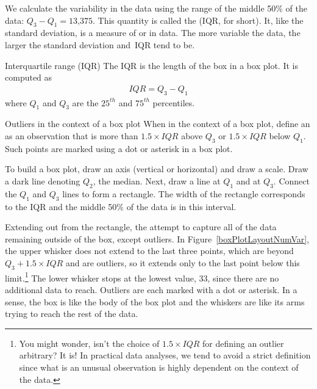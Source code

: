 We calculate the variability in the data using the range of the middle 50\% of the data: $Q_3 - Q_1 = \text{13,375}$. This quantity is called the  (IQR, for short). It, like the standard deviation, is a measure of  or  in data. The more variable the data, the larger the standard deviation and~IQR tend to be.

\D{\newpage}

\begin{onebox}{Interquartile range (IQR)}
The IQR is the length of the box in a box plot. It is computed as
\begin{eqnarray*}
IQR = Q_3 - Q_1
\end{eqnarray*}
where $Q_1$ and $Q_3$ are the $25^{th}$ and $75^{th}$ percentiles.\end{onebox}

\begin{onebox}{Outliers in the context of a box plot}
When in the context of a box plot, define an  as an \mbox{observation} that is more than $1.5 \times IQR$ above $Q_3$ or $1.5 \times IQR$ below $Q_1$. Such points are marked using a dot or asterisk in a box plot.\end{onebox}

To build a box plot, draw an axis (vertical or horizontal) and draw a scale. Draw a dark line denoting $Q_2$, the median. Next, draw a line at $Q_1$ and at $Q_3$. Connect the $Q_1$ and $Q_3$ lines to form a rectangle. The width of the rectangle corresponds to the IQR and the middle 50\% of the data is in this interval.

Extending out from the rectangle, the  attempt to capture all of the data remaining outside of the box, except outliers. In Figure~\ref{boxPlotLayoutNumVar}, the upper whisker does not extend to the last three points, which are beyond $Q_3 + 1.5\times IQR$ and are outliers, so it extends only to the last point below this limit.\footnote{You might wonder, isn't the choice of $1.5 \times IQR$ for defining an outlier arbitrary? It is! In practical data analyses, we tend to avoid a strict definition since what is an unusual observation is highly dependent on the context of the data.} The lower whisker stops at the lowest value, 33, since there are no additional data to reach. Outliers are each marked with a dot or asterisk. In a sense, the box is like the body of the box plot and the whiskers are like its arms trying to reach the rest of the data.

